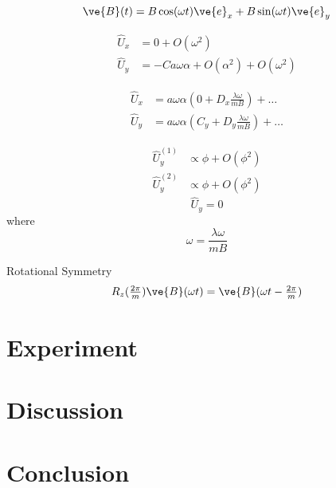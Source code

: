 \begin{equation}
    \ve{B}(t) = B \cos(\omega t) \ve{e}_x + B \sin (\omega t) \ve{e}_y
\end{equation}

\begin{align}
    \hat{U}_x &= 0 + O(\omega^2) 
    \\
    \hat {U}_y &= - C a \omega \alpha + O(\alpha^2) + O(\omega^2) 
\end{align}

\begin{align}
    \hat{U}_x &= a\omega \alpha\left( 0  + D_x \frac{\lambda \omega}{m B}\right) + \dots
    \\
    \hat {U}_y &= a\omega \alpha\left(C_y  + D_y \frac{\lambda\omega}{m B} \right) + \dots
\end{align}

\begin{align}
    \hat{U}_y^{(1)} &\propto \phi + O(\phi^2) 
    \\
    \hat {U}_y^{(2)} &\propto \phi + O(\phi^2)
\end{align}
\begin{equation}
    \hat{U}_y = 0
\end{equation}
where 
\begin{equation}
    \omega = \frac{\lambda\omega}{m B}
\end{equation}

Rotational Symmetry
\begin{equation}
    R_z(\tfrac{2\pi}{m}) \ve{B}(\omega t) = \ve{B}(\omega t - \tfrac{2\pi}{m}) 
\end{equation}


\section{Experiment}
\section{Discussion}
\section{Conclusion}